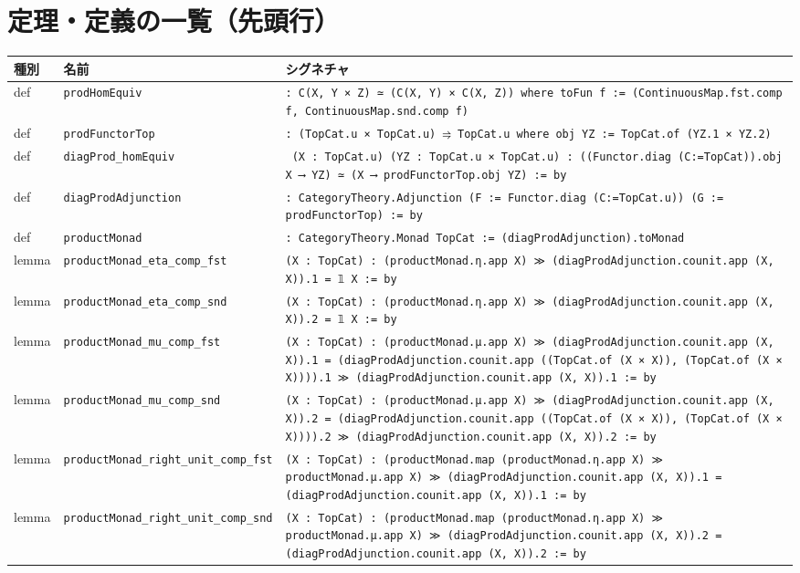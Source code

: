\documentclass[12pt]{article}
\theoremstyle{definition}
\begin{document}
\section*{定理・定義の一覧（先頭行）}
\begin{center}
\begin{tabular}{lll}
\textbf{種別} & \textbf{名前} & \textbf{シグネチャ} \\ \hline
def & \texttt{prodHomEquiv} & \texttt{: C(X, Y × Z) ≃ (C(X, Y) × C(X, Z)) where toFun f := (ContinuousMap.fst.comp f, ContinuousMap.snd.comp f)} \\
def & \texttt{prodFunctorTop} & \texttt{: (TopCat.{u} × TopCat.{u}) ⥤ TopCat.{u} where obj YZ := TopCat.of (YZ.1 × YZ.2)} \\
def & \texttt{diagProd\_homEquiv} & \texttt{ (X : TopCat.{u}) (YZ : TopCat.{u} × TopCat.{u}) : ((Functor.diag (C:=TopCat)).obj X ⟶ YZ) ≃ (X ⟶ prodFunctorTop.obj YZ) := by} \\
def & \texttt{diagProdAdjunction} & \texttt{: CategoryTheory.Adjunction (F := Functor.diag (C:=TopCat.{u})) (G := prodFunctorTop) := by} \\
def & \texttt{productMonad} & \texttt{: CategoryTheory.Monad TopCat := (diagProdAdjunction).toMonad} \\
lemma & \texttt{productMonad\_eta\_comp\_fst} & \texttt{(X : TopCat) : (productMonad.η.app X) ≫ (diagProdAdjunction.counit.app (X, X)).1 = 𝟙 X := by} \\
lemma & \texttt{productMonad\_eta\_comp\_snd} & \texttt{(X : TopCat) : (productMonad.η.app X) ≫ (diagProdAdjunction.counit.app (X, X)).2 = 𝟙 X := by} \\
lemma & \texttt{productMonad\_mu\_comp\_fst} & \texttt{(X : TopCat) : (productMonad.μ.app X) ≫ (diagProdAdjunction.counit.app (X, X)).1 = (diagProdAdjunction.counit.app ((TopCat.of (X × X)), (TopCat.of (X × X)))).1 ≫ (diagProdAdjunction.counit.app (X, X)).1 := by} \\
lemma & \texttt{productMonad\_mu\_comp\_snd} & \texttt{(X : TopCat) : (productMonad.μ.app X) ≫ (diagProdAdjunction.counit.app (X, X)).2 = (diagProdAdjunction.counit.app ((TopCat.of (X × X)), (TopCat.of (X × X)))).2 ≫ (diagProdAdjunction.counit.app (X, X)).2 := by} \\
lemma & \texttt{productMonad\_right\_unit\_comp\_fst} & \texttt{(X : TopCat) : (productMonad.map (productMonad.η.app X) ≫ productMonad.μ.app X) ≫ (diagProdAdjunction.counit.app (X, X)).1 = (diagProdAdjunction.counit.app (X, X)).1 := by} \\
lemma & \texttt{productMonad\_right\_unit\_comp\_snd} & \texttt{(X : TopCat) : (productMonad.map (productMonad.η.app X) ≫ productMonad.μ.app X) ≫ (diagProdAdjunction.counit.app (X, X)).2 = (diagProdAdjunction.counit.app (X, X)).2 := by} \\

\end{tabular}
\end{center}
\end{document}

